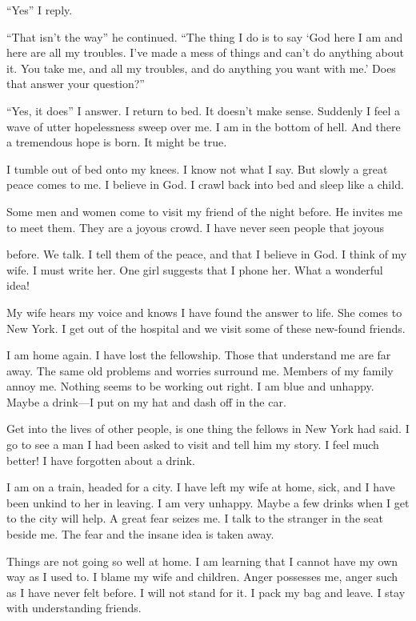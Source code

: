 “Yes” I reply.

“That isn’t the way” he continued. “The thing I do is to say ‘God here I am and here are all my troubles. I’ve made a mess of things and can’t do anything about it. You take me, and all my troubles, and do anything you want with me.’ Does that answer your question?”

“Yes, it does” I answer. I return to bed. It doesn’t make sense. Suddenly I feel a wave of utter hopelessness sweep over me. I am in the bottom of hell. And there a tremendous hope is born. It might be true.

I tumble out of bed onto my knees. I know not what I say. But slowly a great peace comes to me. I believe in God. I crawl back into bed and sleep like a child.

Some men and women come to visit my friend of the night before. He invites me to meet them. They are a joyous crowd. I have never seen people that joyous

before. We talk. I tell them of the peace, and that I believe in God. I think of my wife. I must write her. One girl suggests that I phone her. What a wonderful idea!

My wife hears my voice and knows I have found the answer to life. She comes to New York. I get out of the hospital and we visit some of these new-found friends.

I am home again. I have lost the fellowship. Those that understand me are far away. The same old problems and worries surround me. Members of my family annoy me. Nothing seems to be working out right. I am blue and unhappy. Maybe a drink—I put on my hat and dash off in the car.

Get into the lives of other people, is one thing the fellows in New York had said. I go to see a man I had been asked to visit and tell him my story. I feel much better! I have forgotten about a drink.

I am on a train, headed for a city. I have left my wife at home, sick, and I have been unkind to her in leaving. I am very unhappy. Maybe a few drinks when I get to the city will help. A great fear seizes me. I talk to the stranger in the seat beside me. The fear and the insane idea is taken away.

Things are not going so well at home. I am learning that I cannot have my own way as I used to. I blame my wife and children. Anger possesses me, anger such as I have never felt before. I will not stand for it. I pack my bag and leave. I stay with understanding friends.

